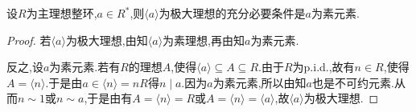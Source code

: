 \documentclass[../../main.tex]{subfiles}%
\begin{document}
\begin{theorem}\label{theorem:抽象代数--定理2.8.4}
设$R$为主理想整环,$a \in R^*$,则$\langle a \rangle$为极大理想的充分必要条件是$a$为素元素.
\end{theorem}
\begin{proof}
若$\langle a \rangle$为极大理想,由知$\langle a \rangle$为素理想,再由知$a$为素元素.

反之,设$a$为素元素.若有$R$的理想$A$,使得$\langle a \rangle \subseteq A \subseteq R$.由于$R$为p.i.d.,故有$n \in R$,使得$A = \langle n \rangle$.于是由$a\in \langle n \rangle=nR$得$n \mid a$.因为$a$为素元素,所以由知$a$也是不可约元素.从而$n \sim 1$或$n \sim a$,于是由有$A = \langle n \rangle = R$或$A = \langle n \rangle = \langle a \rangle$,故$\langle a \rangle$为极大理想.
\end{proof}
\end{document}
